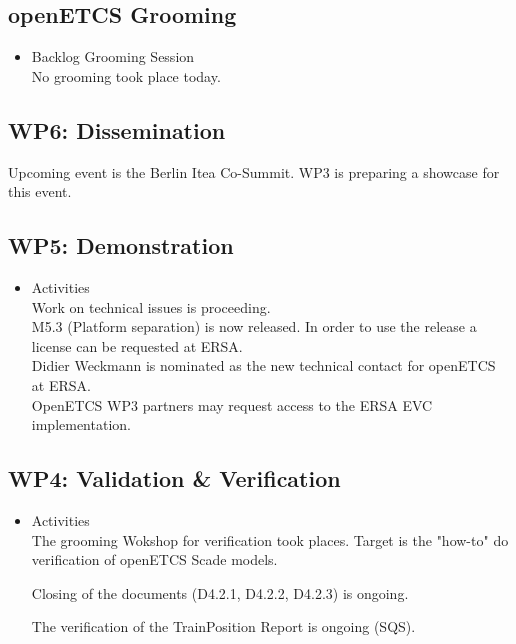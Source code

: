 \documentclass[a4paper, 11pt]{article}
\begin{document}
\subsection{openETCS Grooming}
\begin{itemize}
\item Backlog Grooming Session\\
No grooming took place today.

\end{itemize}

\subsection{WP6: Dissemination}
Upcoming event is the Berlin Itea Co-Summit. WP3 is preparing a showcase for this event.

\subsection{WP5: Demonstration}
\begin{itemize}
\item Activities\\
Work on technical issues is proceeding.\\
M5.3 (Platform separation) is now released. In order to use the release a license can be requested at ERSA.\\
Didier Weckmann is nominated as the new technical contact for openETCS at ERSA. \\

OpenETCS WP3 partners may request access to the ERSA EVC implementation.\\

\end{itemize}

\subsection{WP4: Validation \& Verification}
\begin{itemize}
\item Activities\\
The grooming Wokshop for verification took places. Target is the "how-to" do verification of openETCS Scade models.

Closing of the documents (D4.2.1, D4.2.2, D4.2.3) is ongoing. 

The verification of the TrainPosition Report is ongoing (SQS).
\end{itemize}
\end{document}
